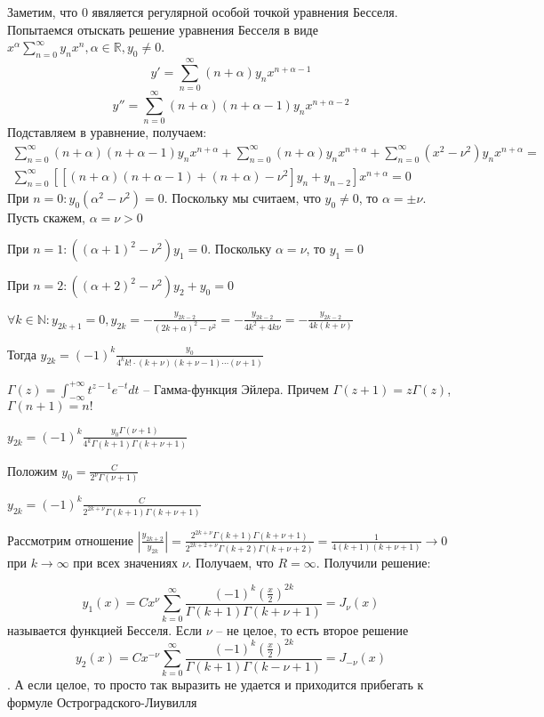 \documentclass[document.tex]{subfiles}
\begin{document}
\begin{remark}
    Заметим, что 0 явяляется регулярной особой точкой уравнения Бесселя. Попытаемся отыскать решение уравнения Бесселя в
    виде $x^{\alpha}\sum_{n = 0}^{\infty}y_n x^n, \alpha \in \mathbb{R}, y_0 \neq 0$. 
    \[
        y' = \sum_{n = 0}^{\infty}(n+\alpha)y_n x^{n + \alpha - 1}
    \]
    \[
        y'' = \sum_{n = 0}^{\infty}(n + \alpha)(n + \alpha - 1) y_n x^{n + \alpha - 2}
    \]
    Подставляем в уравнение, получаем:
    \begin{multline*}
        \sum_{n = 0}^{\infty}(n + \alpha)(n + \alpha - 1) y_n x^{n + \alpha} + \sum_{n = 0}^{\infty}(n + \alpha) y_n
        x^{n + \alpha} + 
        \sum_{n = 0}^{\infty}(x^2 - \nu^2)y_n x^{n + \alpha} = \\
        \sum_{n = 0}^{\infty}\left[\left[(n + \alpha)(n + \alpha - 1) + (n + \alpha) - \nu^2 \right]y_n + y_{n -
        2}\right]x^{n + \alpha} = 0
    \end{multline*}
    При $n = 0: y_0(\alpha^2 - \nu^2) = 0$. Поскольку мы считаем, что $y_0 \neq 0$, то $\alpha = \pm \nu$. Пусть скажем,
    $\alpha = \nu > 0$

    При $n = 1: ((\alpha + 1)^2 - \nu^2)y_1 = 0$. Поскольку $\alpha = \nu$, то $y_1 = 0$

    При $n = 2: ((\alpha + 2)^2 - \nu^2)y_2 + y_0 = 0$

    $\forall k \in \mathbb{N}: y_{2k + 1} = 0, y_{2k} = -\frac{y_{2k - 2}}{(2k + \alpha)^2 - \nu^2} =
    -\frac{y_{2k - 2}}{4k^2 + 4k\nu} = -\frac{y_{2k - 2}}{4k(k + \nu)}$
    
    Тогда $y_{2k} = (-1)^{k}\frac{y_0}{4^{k} k! \cdot (k + \nu) (k + \nu - 1) \cdots (\nu + 1)}$
\end{remark}

\begin{definition}
    $\Gamma(z) = \int_{-\infty}^{+\infty}t^{z - 1}e^{-t}dt$ -- Гамма-функция Эйлера. Причем $\Gamma(z+1) = z\Gamma(z)$,
    $\Gamma(n + 1) = n!$
\end{definition}

$y_{2k} = (-1)^k\frac{y_0 \Gamma(\nu + 1)}{4^{k}\Gamma(k + 1) \Gamma(k + \nu + 1)}$

Положим $y_0 = \frac{C}{2^{\nu}\Gamma(\nu + 1)}$

$y_{2k} = (-1)^k \frac{C}{2^{2k + \nu}\Gamma(k + 1)\Gamma(k + \nu + 1)}$

Рассмотрим отношение $\left| \frac{y_{2k + 2}}{y_{2k}}\right| = \frac{2^{2k + \nu}\Gamma(k + 1)\Gamma(k + \nu +
1)}{2^{2k + 2 + \nu}\Gamma(k + 2)\Gamma(k + \nu + 2)} = \frac{1}{4 (k + 1)(k + \nu + 1)} \rightarrow 0$ при $k
\rightarrow \infty$ при всех значениях $\nu$. Получаем, что $R = \infty$. Получили решение:

\[
    y_1(x) = Cx^{\nu}\sum_{k = 0}^{\infty} \frac{(-1)^k(\frac{x}{2})^{2k}}{\Gamma(k + 1) \Gamma(k + \nu + 1)} =
    J_{\nu}(x)
\]
называется функцией Бесселя. Если $\nu$ -- не целое, то есть второе решение
\[
    y_2(x) = C x^{-\nu}\sum_{k = 0}^{\infty}\frac{(-1)^k (\frac{x}{2})^{2k}}{\Gamma(k + 1) \Gamma (k - \nu + 1)} =
    J_{-\nu}(x)
\]. А если целое, то просто так выразить не удается и приходится прибегать к формуле Остроградского-Лиувилля
\end{document}
